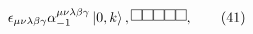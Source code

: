 \begin{equation}
\epsilon _{\mu \nu \lambda \beta \gamma }\alpha _{-1}^{\mu \nu \lambda \beta
\gamma }\left\vert 0,k\right\rangle ,\raisebox{0.06in}{\fbox{%
\rule[0.04cm]{0.04cm}{0cm}}}\raisebox{0.06in}{\fbox{%
\rule[0.04cm]{0.04cm}{0cm}}}\raisebox{0.06in}{\fbox{%
\rule[0.04cm]{0.04cm}{0cm}}}\raisebox{0.06in}{\fbox{%
\rule[0.04cm]{0.04cm}{0cm}}}\raisebox{0.06in}{\fbox{%
\rule[0.04cm]{0.04cm}{0cm}}},  \tag{41}
\end{equation}

